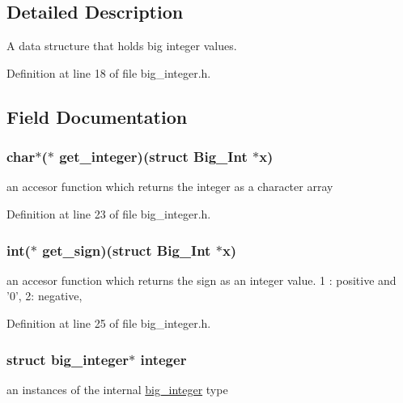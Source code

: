 \subsection{Detailed Description}
A data structure that holds big integer values. 

Definition at line 18 of file big\-\_\-integer.\-h.



\subsection{Field Documentation}
\hypertarget{struct_big___int_ac8d650b12656faee53d9ebd863e9fe8f}{
\subsubsection[{get\-\_\-integer}]{\setlength{\rightskip}{0pt plus 5cm}char$\ast$($\ast$ get\-\_\-integer)(struct {\bf Big\-\_\-\-Int} $\ast$x)}}\label{struct_big___int_ac8d650b12656faee53d9ebd863e9fe8f}
an accesor function which returns the integer as a character array 

Definition at line 23 of file big\-\_\-integer.\-h.

\hypertarget{struct_big___int_ae06ba678ba07ecdac264605bc8576da2}{
\subsubsection[{get\-\_\-sign}]{\setlength{\rightskip}{0pt plus 5cm}int($\ast$ get\-\_\-sign)(struct {\bf Big\-\_\-\-Int} $\ast$x)}}\label{struct_big___int_ae06ba678ba07ecdac264605bc8576da2}
an accesor function which returns the sign as an integer value. 1 \-: positive and '0', 2\-: negative, 

Definition at line 25 of file big\-\_\-integer.\-h.

\hypertarget{struct_big___int_af78495b20eeda6242727ea99032693c2}{
\subsubsection[{integer}]{\setlength{\rightskip}{0pt plus 5cm}struct {\bf big\-\_\-integer}$\ast$ integer}}\label{struct_big___int_af78495b20eeda6242727ea99032693c2}
an instances of the internal \hyperlink{big__integer__impl_8h_structbig__integer}{big\-\_\-integer} type 

